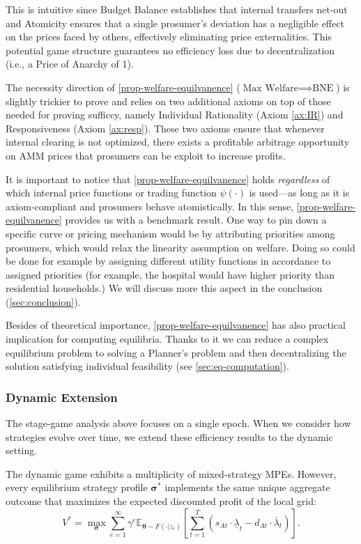 \documentclass[12pt, notitlepage]{article}
\begin{document}
This is intuitive since Budget Balance establishes that internal transfers net-out and Atomicity ensures that a single prosumer's deviation has a negligible effect on the prices faced by others, effectively eliminating price externalities. This potential game structure guarantees no efficiency loss due to decentralization (i.e., a Price of Anarchy of 1).

The necessity direction of \cref{prop-welfare-equilvanence} ($\text{Max Welfare} \implies \text{BNE}$) is slightly trickier to prove and relies on two additional axioms on top of those needed for proving sufficcy, namely Individual Rationality (Axiom \ref{ax:IR}) and Responsiveness (Axiom \ref{ax:resp}). These two axioms ensure that whenever internal clearing is not optimized, there exists a profitable arbitrage opportunity on AMM prices that prosumers can be exploit to increase profits. 


It is important to notice that \cref{prop-welfare-equilvanence} holds \textit{regardless} of which internal price functions or trading function $\psi(\cdot)$ is used---as long as it is axiom-compliant and prosumers behave atomistically. In this sense, \cref{prop-welfare-equilvanence} provides us with a benchmark result. One way to pin down a specific curve or pricing mechanism would be by attributing priorities among prosumers, which would relax the linearity assumption on welfare. Doing so could be done for example by assigning different utility functions in accordance to assigned priorities (for example, the  hospital would have higher priority than residential households.) We will discuss more this aspect in the conclusion (\cref{sec:conclusion}). 

Besides of theoretical importance, \cref{prop-welfare-equilvanence} has also practical implication for computing equilibria. Thanks to it we can reduce a complex equilibrium problem to solving a Planner's problem and then decentralizing the solution satisfying individual feasibility (see \cref{sec:eq-computation}).  



\subsubsection*{Dynamic Extension}

The stage-game analysis above focuses on a single epoch. When we consider how strategies evolve over time, we extend these efficiency results to the dynamic setting.

\begin{proposition}\label{prop-markov} 
The dynamic game exhibits a multiplicity of mixed-strategy MPEs. However, every equilibrium strategy profile $\boldsymbol{\sigma}^*$ implements the same unique aggregate outcome that maximizes the expected discounted profit of the local grid:
\begin{equation}
V^* = \max_{\boldsymbol{\sigma}} \sum_{e=1}^\infty \gamma^e \mathbb{E}_{\boldsymbol{\theta} \sim F(\cdot|z_e)} \left[ \sum_{t=1}^T \left( s_{At} \cdot \underline{\lambda}_t - d_{At} \cdot \overline{\lambda}_t \right) \right].
\end{equation}
\end{proposition}
\end{document}
